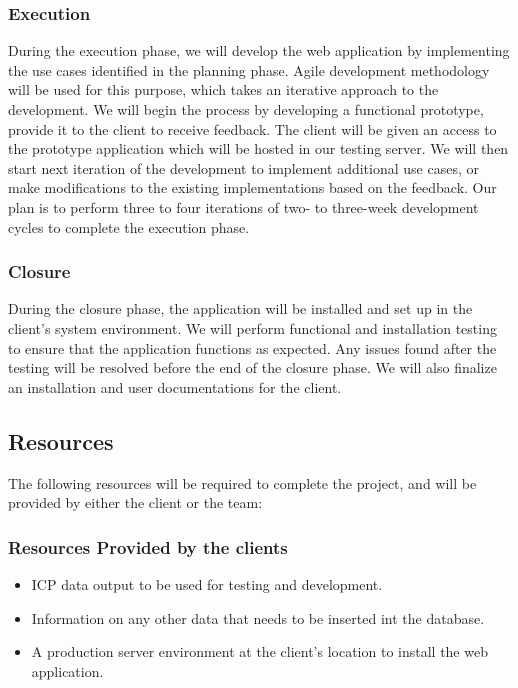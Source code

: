\documentclass[10pt,twocolumn,letterpaper]{article}
\begin{document}
                \subsubsection{Execution}
                During the execution phase, we will develop the web application by implementing the use cases identified in the planning phase. 
                Agile development methodology will be used for this purpose, which takes an iterative approach to the development. 
                We will begin the process by developing a functional prototype, provide it to the client to receive feedback. 
                The client will be given an access to the prototype application which will be hosted in our testing server. 
                We will then start next iteration of the development to implement additional use cases, or make modifications to the existing implementations based on the feedback. Our plan is to perform three to four iterations of two- to three-week development cycles to complete the execution phase.
                \subsubsection{Closure}
                During the closure phase, the application will be installed and set up in the client's system environment. 
                We will perform functional and installation testing to ensure that the application functions as expected. 
                Any issues found after the testing will be resolved before the end of the closure phase. We will also finalize an installation and user documentations for the client.
            \subsection{Resources}

            The following resources will be required to complete the project, and will be provided by either the client or the team:
                \subsubsection{Resources Provided by the clients}
                \begin{itemize}
                  \item ICP data output to be used for testing and development.
                  \item Information on any other data that needs to be inserted int the database.
                  \item A production server environment at the client's location to install the web application.
                \end{itemize}
\end{document}
